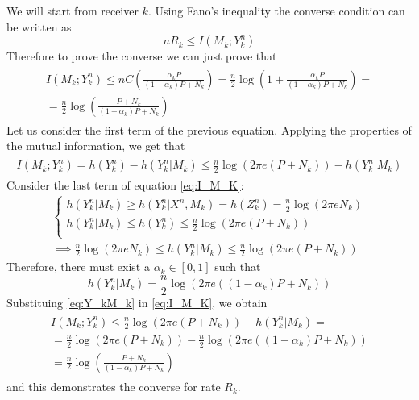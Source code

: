 We will start from receiver $k$. Using Fano's inequality the converse condition can be written as
\begin{equation}
  nR_k\leq I(M_k;Y^n_k)
\end{equation}
Therefore to prove the converse we can just prove that
\begin{align}
  \begin{split}
    I(M_k;Y^n_k)\leq nC\left(\frac{\alpha_k P}{\left(1-\alpha_k\right)P + N_k}\right) = \frac{n}{2}\log\left(1+\frac{\alpha_k P}{\left(1-\alpha_k\right)P + N_k}\right)=\\
    =\frac{n}{2}\log\left(\frac{P+N_k}{\left(1-\alpha_k\right)P + N_k}\right)
  \end{split}
\end{align}
Let us consider the first term of the previous equation. Applying the properties of the mutual information, we get that
\begin{align}
  \begin{split}
    I(M_k;Y_k^n) = h(Y_k^n) - h(Y_k^n|M_k)
    \leq \frac{n}{2}\log(2\pi e (P+N_k))- h(Y_k^n|M_k)
    \label{eq:I_M_K}
  \end{split}
\end{align}
Consider the last term of equation \ref{eq:I_M_K}:
\begin{align}
  \begin{cases}
  h(Y_k^n|M_k)\geq h(Y_k^n|X^n,M_k) = h(Z^n_k) = \frac{n}{2}\log\left(2\pi e N_k\right) \\
  h(Y_k^n|M_k)\leq h(Y_k^n)\leq \frac{n}{2} \log(2\pi e (P+N_k))\\
  \end{cases}
  \\
  \implies \frac{n}{2}\log\left(2\pi e N_k\right)\leq h(Y_k^n|M_k) \leq \frac{n}{2} \log(2\pi e (P+N_k))
\end{align}
Therefore, there must exist a $\alpha_k \in [0,1]$ such that
\begin{equation}
  h(Y_k^n|M_k) = \frac{n}{2}\log(2\pi e ((1-\alpha_k) P+N_k))
  \label{eq:Y_kM_k}
\end{equation}
Substituing \ref{eq:Y_kM_k} in \ref{eq:I_M_K}, we obtain
\begin{align}
  \begin{split}
    I(M_k;Y_k^n) \leq \frac{n}{2}\log(2\pi e (P+N_k))- h(Y_k^n|M_k) =\\ =\frac{n}{2}\log(2\pi e (P+N_k))-\frac{n}{2}\log(2\pi e ((1-\alpha_k) P+N_k))\\
    = \frac{n}{2}\log(\frac{P+N_k}{(1-\alpha_k)P+N_k})
  \end{split}
  \label{eq:I_M_K}
\end{align}
and this demonstrates the converse for rate $R_k$.\\

